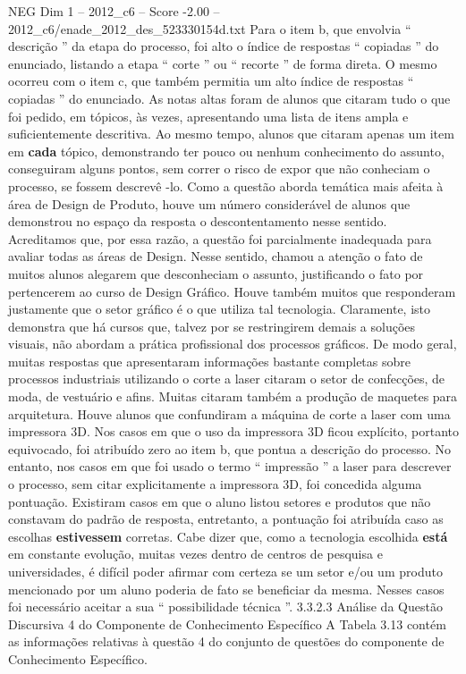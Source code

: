 \begin{textsample}{NEG Dim 1 – 2012\_c6 – Score -2.00 – 2012\_c6/enade\_2012\_des\_523330154d.txt}
Para o item b, que envolvia “ descrição ” da etapa do processo, foi alto o índice de respostas “ copiadas ” do enunciado, listando a etapa “ corte ” ou “ recorte ” de forma direta.
O mesmo ocorreu com o item c, que também permitia um alto índice de respostas “ copiadas ” do enunciado.
As notas altas foram de alunos que citaram tudo o que foi pedido, em tópicos, às vezes, apresentando uma lista de itens ampla e suficientemente descritiva.
Ao mesmo tempo, alunos que citaram apenas um item em \textbf{cada} tópico, demonstrando ter pouco ou nenhum conhecimento do assunto, conseguiram alguns pontos, sem correr o risco de expor que não conheciam o processo, se fossem descrevê -lo.
Como a questão aborda temática mais afeita à área de Design de Produto, houve um número considerável de alunos que demonstrou no espaço da resposta o descontentamento nesse sentido.
Acreditamos que, por essa razão, a questão foi parcialmente inadequada para avaliar todas as áreas de Design.
Nesse sentido, chamou a atenção o fato de muitos alunos alegarem que desconheciam o assunto, justificando o fato por pertencerem ao curso de Design Gráfico.
Houve também muitos que responderam justamente que o setor gráfico é o que utiliza tal tecnologia.
Claramente, isto demonstra que há cursos que, talvez por se restringirem demais a soluções visuais, não abordam a prática profissional dos processos gráficos.
De modo geral, muitas respostas que apresentaram informações bastante completas sobre processos industriais utilizando o corte a laser citaram o setor de confecções, de moda, de vestuário e afins.
Muitas citaram também a produção de maquetes para arquitetura.
Houve alunos que confundiram a máquina de corte a laser com uma impressora 3D.
Nos casos em que o uso da impressora 3D ficou explícito, portanto equivocado, foi atribuído zero ao item b, que pontua a descrição do processo.
No entanto, nos casos em que foi usado o termo “ impressão ” a laser para descrever o processo, sem citar explicitamente a impressora 3D, foi concedida alguma pontuação.
Existiram casos em que o aluno listou setores e produtos que não constavam do padrão de resposta, entretanto, a pontuação foi atribuída caso as escolhas \textbf{estivessem} corretas.
Cabe dizer que, como a tecnologia escolhida \textbf{está} em constante evolução, muitas vezes dentro de centros de pesquisa e universidades, é difícil poder afirmar com certeza se um setor e/ou um produto mencionado por um aluno poderia de fato se beneficiar da mesma.
Nesses casos foi necessário aceitar a sua “ possibilidade técnica ”. 3.3.2.3 Análise da Questão Discursiva 4 do Componente de Conhecimento Específico A Tabela 3.13 contém as informações relativas à questão 4 do conjunto de questões do componente de Conhecimento Específico.

\end{textsample}
